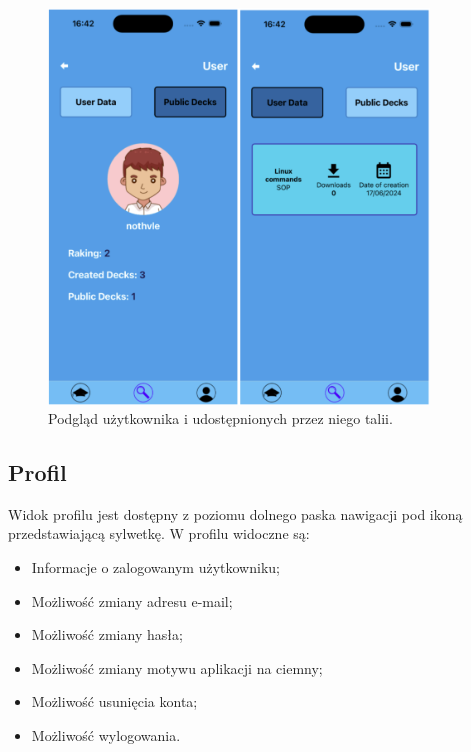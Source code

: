 \begin{figure}[H]
    \centering
    \includegraphics[width=0.9\textwidth]{chapters/chapter_10/images_mobile/mobile_other_user}
    \caption{Podgląd użytkownika i udostępnionych przez niego talii.}
    \label{img:mobile_other_user}
\end{figure}


\subsection{Profil}
Widok profilu jest dostępny z poziomu dolnego paska nawigacji pod ikoną przedstawiającą sylwetkę. W profilu widoczne są:
\begin{itemize}
    \item Informacje o zalogowanym użytkowniku;
    \item Możliwość zmiany adresu e-mail;
    \item Możliwość zmiany hasła;
    \item Możliwość zmiany motywu aplikacji na ciemny;
    \item Możliwość usunięcia konta;
    \item Możliwość wylogowania.
\end{itemize}


